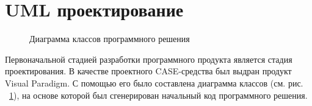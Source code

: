 \section{UML проектирование}

\begin{figure}[h]
\caption{Диаграмма классов программного решения}
\label{ris:UML}
\end{figure}

Первоначальной стадией разработки программного продукта является стадия проектирования.
В качестве проектного CASE-средства был выдран продукт Visual Paradigm.
С помощью его было составлена диаграмма классов (см. рис. ~\ref{ris:UML}), на основе которой был сгенерирован начальный код программного решения.